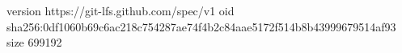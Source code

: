 version https://git-lfs.github.com/spec/v1
oid sha256:0df1060b69c6ac218c754287ae74f4b2c84aae5172f514b8b43999679514af93
size 699192

